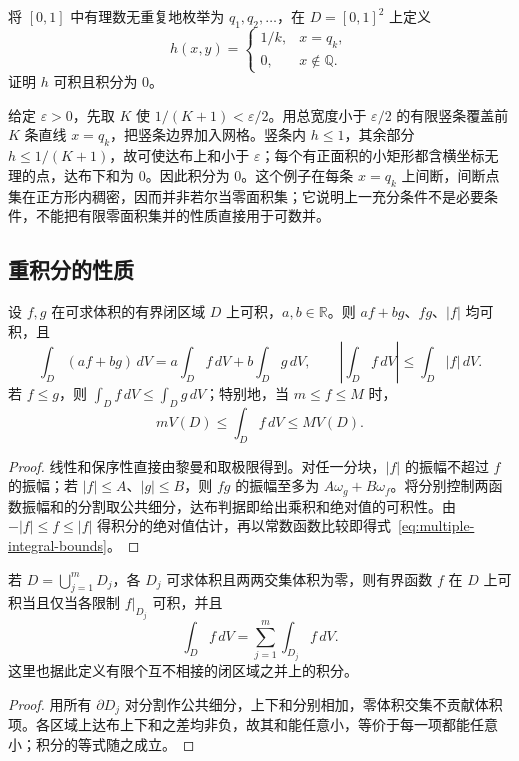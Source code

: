 \documentclass[UTF8,12pt,a4paper,fontset=fandol]{ctexbook}
\begin{document}
\begin{example}
\label{ex:multiple-dense-line-discontinuities}
将 $[0,1]$ 中有理数无重复地枚举为 $q_1,q_2,\ldots$，在 $D=[0,1]^2$ 上定义
\[
    h(x,y)=\begin{cases}1/k,&x=q_k,\\0,&x\notin\mathbb Q.\end{cases}
\]
证明 $h$ 可积且积分为 $0$。
\end{example}
\begin{solve}
给定 $\varepsilon>0$，先取 $K$ 使 $1/(K+1)<\varepsilon/2$。用总宽度小于 $\varepsilon/2$ 的有限竖条覆盖前 $K$ 条直线 $x=q_k$，把竖条边界加入网格。竖条内 $h\leq1$，其余部分 $h\leq1/(K+1)$，故可使达布上和小于 $\varepsilon$；每个有正面积的小矩形都含横坐标无理的点，达布下和为 $0$。因此积分为 $0$。这个例子在每条 $x=q_k$ 上间断，间断点集在正方形内稠密，因而并非若尔当零面积集；它说明上一充分条件不是必要条件，不能把有限零面积集并的性质直接用于可数并。
\end{solve}

\subsection{重积分的性质}
\label{subsec:properties-of-multiple-integrals}

\begin{theorem}
\label{thm:multiple-integral-algebra-order}
设 $f,g$ 在可求体积的有界闭区域 $D$ 上可积，$a,b\in\mathbb R$。则 $af+bg$、$fg$、$|f|$ 均可积，且
\[
    \int_D(af+bg)\,dV=a\int_Df\,dV+b\int_Dg\,dV,
    \qquad
    \left|\int_Df\,dV\right|\leq\int_D|f|\,dV.
\]
若 $f\leq g$，则 $\int_Df\,dV\leq\int_Dg\,dV$；特别地，当 $m\leq f\leq M$ 时，
\begin{equation}
    mV(D)\leq\int_Df\,dV\leq MV(D).
    \label{eq:multiple-integral-bounds}
\end{equation}
\end{theorem}
\begin{proof}
线性和保序性直接由黎曼和取极限得到。对任一分块，$|f|$ 的振幅不超过 $f$ 的振幅；若 $|f|\leq A$、$|g|\leq B$，则 $fg$ 的振幅至多为 $A\omega_g+B\omega_f$。将分别控制两函数振幅和的分割取公共细分，达布判据即给出乘积和绝对值的可积性。由 $-|f|\leq f\leq|f|$ 得积分的绝对值估计，再以常数函数比较即得式~\eqref{eq:multiple-integral-bounds}。
\end{proof}

\begin{proposition}
\label{prop:multiple-domain-additivity}
若 $D=\bigcup_{j=1}^mD_j$，各 $D_j$ 可求体积且两两交集体积为零，则有界函数 $f$ 在 $D$ 上可积当且仅当各限制 $f|_{D_j}$ 可积，并且
\begin{equation}
    \int_Df\,dV=\sum_{j=1}^m\int_{D_j}f\,dV.
    \label{eq:multiple-domain-additivity}
\end{equation}
这里也据此定义有限个互不相接的闭区域之并上的积分。
\end{proposition}
\begin{proof}
用所有 $\partial D_j$ 对分割作公共细分，上下和分别相加，零体积交集不贡献体积项。各区域上达布上下和之差均非负，故其和能任意小，等价于每一项都能任意小；积分的等式随之成立。
\end{proof}
\end{document}
